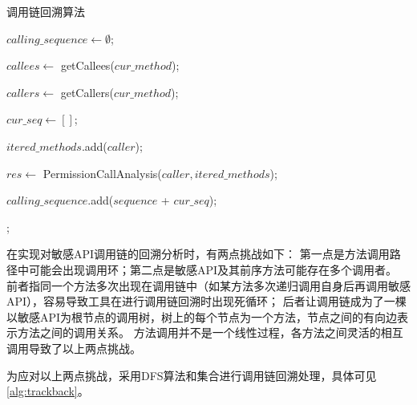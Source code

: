 \begin{algorithm}[!ht]
    \tablewuhao
    \caption{调用链回溯算法}
    \label{alg:trackback}

     {

    $calling\_sequence \gets \emptyset$;

    $callees \gets$ getCallees($cur\_method$);

    $callers \gets$ getCallers($cur\_method$);

    $cur\_seq \gets  []$;

     {
    }

     {
         {
            $itered\_methods$.add($caller$);

            $res \gets$ PermissionCallAnalysis($caller, itered\_methods$);

             {

                $calling\_sequence$.add($sequence$ + $cur\_seq$);

            }
        }
    }

    ;

    }

\end{algorithm}

在实现对敏感API调用链的回溯分析时，有两点挑战如下：
第一点是方法调用路径中可能会出现调用环；第二点是敏感API及其前序方法可能存在多个调用者。
前者指同一个方法多次出现在调用链中（如某方法多次递归调用自身后再调用敏感API），容易导致工具在进行调用链回溯时出现死循环；
后者让调用链成为了一棵以敏感API为根节点的调用树，树上的每个节点为一个方法，节点之间的有向边表示方法之间的调用关系。
方法调用并不是一个线性过程，各方法之间灵活的相互调用导致了以上两点挑战。

为应对以上两点挑战，\componentC 采用DFS算法和集合进行调用链回溯处理，具体可见\autoref{alg:trackback}。

